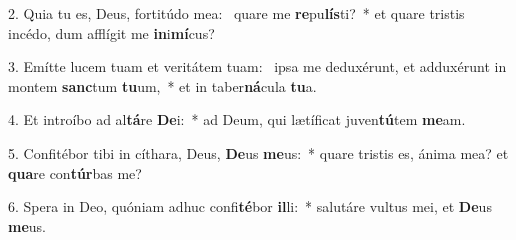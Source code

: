 2. Quia tu es, Deus, fortitúdo mea: \dag\  quare me \textbf{re}pu\textbf{lís}ti?~*  et quare tristis incédo, dum afflígit me \textbf{in}i\textbf{mí}cus?\

3. Emítte lucem tuam et veritátem tuam: \dag\  ipsa me deduxérunt, et adduxérunt in montem \textbf{sanc}tum \textbf{tu}um,~*  et in taber\textbf{ná}cula \textbf{tu}a.\

4. Et introíbo ad al\textbf{tá}re \textbf{De}i:~*  ad Deum, qui lætíficat juven\textbf{tú}tem \textbf{me}am.\

5. Confitébor tibi in cíthara, Deus, \textbf{De}us \textbf{me}us:~*  quare tristis es, ánima mea? et \textbf{qua}re con\textbf{túr}bas me?\

6. Spera in Deo, quóniam adhuc confi\textbf{té}bor \textbf{il}li:~*  salutáre vultus mei, et \textbf{De}us \textbf{me}us.\

